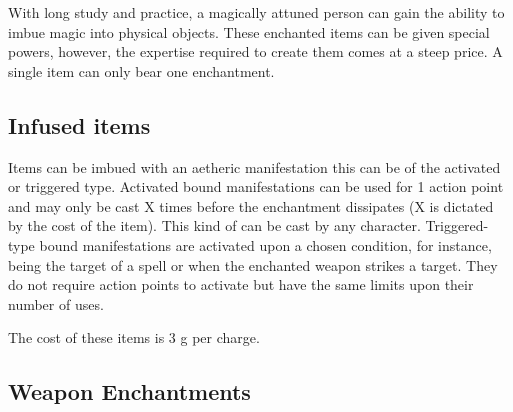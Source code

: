 \documentclass[a4paper,11pt,oneside]{book}
\newcommand{\textlf}[1]{\textbf{\titlecap{#1}}}
\begin{document}
With long study and practice, a magically attuned person can gain the ability to imbue magic into physical objects. These enchanted items can be given special powers, however, the expertise required to create them comes at a steep price. A single item can only bear one enchantment.

\subsection{Infused items}
Items can be imbued with an aetheric manifestation this can be of the activated or triggered type. Activated bound manifestations can be used for 1 action point and may only be cast X times before the enchantment dissipates (X is dictated by the cost of the item). This kind of \textlf{Bound spell} can be cast by any character. Triggered-type bound manifestations are activated upon a chosen condition, for instance, being the target of a spell or when the enchanted weapon strikes a target. They do not require action points to activate but have the same limits upon their number of uses. 

The cost of these items is 3 g per charge.

%

\subsection{Weapon Enchantments}
\end{document}
